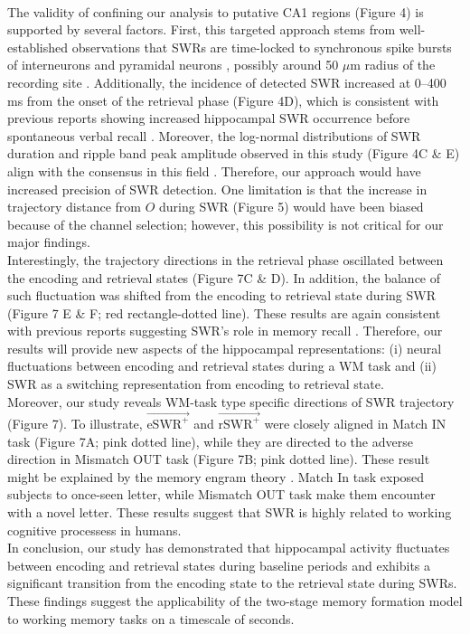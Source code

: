 \documentclass[final,3p,times,twocolumn]{elsarticle}
\begin{document}
\\
\indent
The validity of confining our analysis to putative CA1 regions (Figure 4) is supported by several factors. First, this targeted approach stems from well-established observations that SWRs are time-locked to synchronous spike bursts of interneurons and pyramidal neurons \cite{buzsaki_two-stage_1989} \cite{quyen_cell_2008} \cite{royer_control_2012} \cite{hajos_input-output_2013}, possibly around 50 $\mu$m radius of the recording site \cite{schomburg_spiking_2012}. Additionally, the incidence of detected SWR increased at 0--400 ms from the onset of the retrieval phase (Figure 4D), which is consistent with previous reports showing increased hippocampal SWR occurrence before spontaneous verbal recall \cite{norman_hippocampal_2019} \cite{norman_hippocampal_2021}. Moreover, the log-normal distributions of SWR duration and ripple band peak amplitude observed in this study (Figure 4C \& E) align with the consensus in this field \cite{liu_consensus_2022}. Therefore, our approach would have increased precision of SWR detection. One limitation is that the increase in trajectory distance from $O$ during SWR (Figure 5) would have been biased because of the channel selection; however, this possibility is not critical for our major findings.
\\
\indent
Interestingly, the trajectory directions in the retrieval phase oscillated between the encoding and retrieval states (Figure 7C \& D). In addition, the balance of such fluctuation was shifted from the encoding to retrieval state during SWR (Figure 7 E \& F; red rectangle-dotted line). These results are again consistent with previous reports suggesting SWR's role in memory recall \cite{norman_hippocampal_2019} \cite{norman_hippocampal_2021}. Therefore, our results will provide new aspects of the hippocampal representations: (i) neural fluctuations between encoding and retrieval states during a WM task and (ii) SWR as a switching representation from encoding to retrieval state.
\\
\indent
Moreover, our study reveals WM-task type specific directions of SWR trajectory (Figure 7). To illustrate, $\overrightarrow{\mathrm{eSWR^+}}$ and $\overrightarrow{\mathrm{rSWR^+}}$ were closely aligned in Match IN task (Figure 7A; pink dotted line), while they are directed to the adverse direction in Mismatch OUT task (Figure 7B; pink dotted line). These result might be explained by the memory engram theory \cite{liu_optogenetic_2012}. Match In task exposed subjects to once-seen letter, while Mismatch OUT task make them encounter with a novel letter. These results suggest that SWR is highly related to working cognitive processess in humans.
\\
\indent
In conclusion, our study has demonstrated that hippocampal activity fluctuates between encoding and retrieval states during baseline periods and exhibits a significant transition from the encoding state to the retrieval state during SWRs. These findings suggest the applicability of the two-stage memory formation model \cite{buzsaki_two-stage_1989} to working memory tasks on a timescale of seconds.
\end{document}
